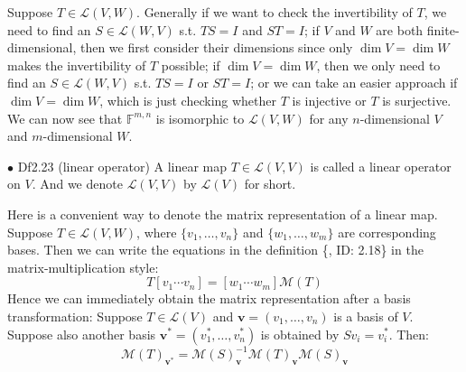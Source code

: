 \documentclass{article}
\begin{document}
\begin{Rmk}{}
    Suppose $T\in\mathcal{L}(V, W)$. Generally if we want to check the invertibility of $T$, we need to find an $S\in\mathcal{L}(W, V)$ s.t. $TS = I$ and $ST = I$; if $V$ and $W$ are both finite-dimensional, then we first consider their dimensions since only $\dim V = \dim W$ makes the invertibility of $T$ possible; if $\dim V = \dim W$, then we only need to find an $S\in\mathcal{L}(W, V)$ s.t. $TS = I$ or $ST = I$; or we can take an easier approach if $\dim V = \dim W$, which is just checking whether $T$ is injective or $T$ is surjective.\\
    \textcolor{Th}{We can now see that $\mathbb{F}^{m,n}$ is isomorphic to $\mathcal{L}(V, W)$ for any $n$-dimensional $V$ and $m$-dimensional $W$.}
\end{Rmk}

\begin{Df}{$\bullet$ Df2.23 (linear operator)}
    A linear map $T\in\mathcal{L}(V, V)$ is called a linear operator on $V$. And we denote $\mathcal{L}(V,V)$ by $\mathcal{L}(V)$ for short.
\end{Df}

\begin{Rmk}{}
    Here is a convenient way to denote the matrix representation of a linear map. Suppose $T\in\mathcal{L}(V, W)$, where $\{v_1, \dots, v_n\}$ and $\{w_1, \dots, w_m\}$ are corresponding bases. Then we can write the equations in the definition \{, ID: 2.18\} in the matrix-multiplication style:
    $$T[v_1 \cdots v_n] = [w_1 \cdots w_m]\mathcal{M}(T)$$
    Hence we can immediately obtain the matrix representation after a basis transformation:
    \textcolor{Th}{Suppose $T\in\mathcal{L}(V)$ and $\pmb{v} = (v_1, \dots, v_n)$ is a basis of $V$. Suppose also another basis $\pmb{v}^\ast = (v_1^\ast, \dots, v_n^\ast)$ is obtained by $Sv_i = v_i^\ast$. Then:}
    \textcolor{Th}{
    $$\mathcal{M}(T)_{\pmb{v^\ast}} = \mathcal{M}(S)_{\pmb{v}}^{-1} \mathcal{M}(T)_{\pmb{v}} \mathcal{M}(S)_{\pmb{v}}$$}
\end{Rmk}
\end{document}
